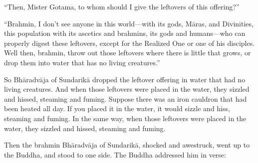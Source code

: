 \documentclass[12pt,openany]{book}%
\begin{document}
“Then, Mister Gotama, to whom should I give the leftovers of this offering?” 

“Brahmin, I don’t see anyone in this world—with its gods, \textsanskrit{Māras}, and Divinities, this population with its ascetics and brahmins, its gods and humans—who can properly digest these leftovers, except for the Realized One or one of his disciples. Well then, brahmin, throw out those leftovers where there is little that grows, or drop them into water that has no living creatures.” 

So \textsanskrit{Bhāradvāja} of \textsanskrit{Sundarikā} dropped the leftover offering in water that had no living creatures. And when those leftovers were placed in the water, they sizzled and hissed, steaming and fuming. Suppose there was an iron cauldron that had been heated all day. If you placed it in the water, it would sizzle and hiss, steaming and fuming. In the same way, when those leftovers were placed in the water, they sizzled and hissed, steaming and fuming. 

Then the brahmin \textsanskrit{Bhāradvāja} of \textsanskrit{Sundarikā}, shocked and awestruck, went up to the Buddha, and stood to one side. The Buddha addressed him in verse: 
\end{document}
